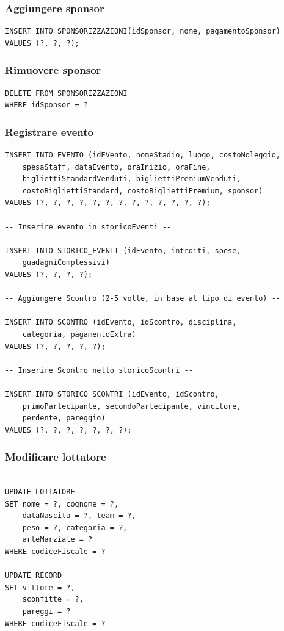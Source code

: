 \documentclass[a4paper,12pt]{report}
\begin{document}
\subsubsection{Aggiungere sponsor}
\begin{verbatim}
INSERT INTO SPONSORIZZAZIONI(idSponsor, nome, pagamentoSponsor)
VALUES (?, ?, ?);
\end{verbatim}
\subsubsection{Rimuovere sponsor}
\begin{verbatim}
DELETE FROM SPONSORIZZAZIONI
WHERE idSponsor = ?
\end{verbatim}
\subsubsection{Registrare evento}
\begin{verbatim}
INSERT INTO EVENTO (idEVento, nomeStadio, luogo, costoNoleggio,
    spesaStaff, dataEvento, oraInizio, oraFine, 
    bigliettiStandardVenduti, bigliettiPremiumVenduti, 
    costoBigliettiStandard, costoBigliettiPremium, sponsor)
VALUES (?, ?, ?, ?, ?, ?, ?, ?, ?, ?, ?, ?, ?);

-- Inserire evento in storicoEventi --

INSERT INTO STORICO_EVENTI (idEvento, introiti, spese, 
    guadagniComplessivi)
VALUES (?, ?, ?, ?);

-- Aggiungere Scontro (2-5 volte, in base al tipo di evento) --

INSERT INTO SCONTRO (idEvento, idScontro, disciplina, 
    categoria, pagamentoExtra)
VALUES (?, ?, ?, ?, ?);

-- Inserire Scontro nello storicoScontri --

INSERT INTO STORICO_SCONTRI (idEvento, idScontro, 
    primoPartecipante, secondoPartecipante, vincitore, 
    perdente, pareggio)
VALUES (?, ?, ?, ?, ?, ?, ?);
\end{verbatim}
\subsubsection{Modificare lottatore}
\begin{verbatim}

UPDATE LOTTATORE 
SET nome = ?, cognome = ?,
    dataNascita = ?, team = ?, 
    peso = ?, categoria = ?, 
    arteMarziale = ?
WHERE codiceFiscale = ?

UPDATE RECORD 
SET vittore = ?,
    sconfitte = ?,
    pareggi = ?
WHERE codiceFiscale = ?
    
\end{verbatim}
\end{document}
